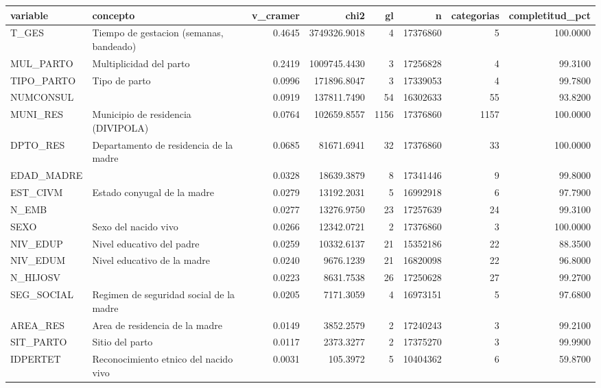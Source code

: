\begin{tabular}{llrrrrrr}
\toprule
variable & concepto & v\_cramer & chi2 & gl & n & categorias & completitud\_pct \\
\midrule
T\_GES & Tiempo de gestacion (semanas, bandeado) & 0.4645 & 3749326.9018 & 4 & 17376860 & 5 & 100.0000 \\
MUL\_PARTO & Multiplicidad del parto & 0.2419 & 1009745.4430 & 3 & 17256828 & 4 & 99.3100 \\
TIPO\_PARTO & Tipo de parto & 0.0996 & 171896.8047 & 3 & 17339053 & 4 & 99.7800 \\
NUMCONSUL &  & 0.0919 & 137811.7490 & 54 & 16302633 & 55 & 93.8200 \\
MUNI\_RES & Municipio de residencia (DIVIPOLA) & 0.0764 & 102659.8557 & 1156 & 17376860 & 1157 & 100.0000 \\
DPTO\_RES & Departamento de residencia de la madre & 0.0685 & 81671.6941 & 32 & 17376860 & 33 & 100.0000 \\
EDAD\_MADRE &  & 0.0328 & 18639.3879 & 8 & 17341446 & 9 & 99.8000 \\
EST\_CIVM & Estado conyugal de la madre & 0.0279 & 13192.2031 & 5 & 16992918 & 6 & 97.7900 \\
N\_EMB &  & 0.0277 & 13276.9750 & 23 & 17257639 & 24 & 99.3100 \\
SEXO & Sexo del nacido vivo & 0.0266 & 12342.0721 & 2 & 17376860 & 3 & 100.0000 \\
NIV\_EDUP & Nivel educativo del padre & 0.0259 & 10332.6137 & 21 & 15352186 & 22 & 88.3500 \\
NIV\_EDUM & Nivel educativo de la madre & 0.0240 & 9676.1239 & 21 & 16820098 & 22 & 96.8000 \\
N\_HIJOSV &  & 0.0223 & 8631.7538 & 26 & 17250628 & 27 & 99.2700 \\
SEG\_SOCIAL & Regimen de seguridad social de la madre & 0.0205 & 7171.3059 & 4 & 16973151 & 5 & 97.6800 \\
AREA\_RES & Area de residencia de la madre & 0.0149 & 3852.2579 & 2 & 17240243 & 3 & 99.2100 \\
SIT\_PARTO & Sitio del parto & 0.0117 & 2373.3277 & 2 & 17375270 & 3 & 99.9900 \\
IDPERTET & Reconocimiento etnico del nacido vivo & 0.0031 & 105.3972 & 5 & 10404362 & 6 & 59.8700 \\
\bottomrule
\end{tabular}
